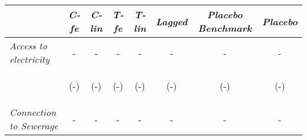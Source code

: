 \begin{tabular}{lccccccc}


\hline
\hline


\multicolumn{1}{l}{} & \multicolumn{1}{c}{\textit{C-fe}} & \multicolumn{1}{c}{\textit{C-lin}} & \multicolumn{1}{c}{\textit{T-fe}} & \multicolumn{1}{c}{\textit{T-lin}} & \multicolumn{1}{c}{\textit{Lagged}} & \multicolumn{1}{c}{\textit{Placebo Benchmark}} & \multicolumn{1}{c}{\textit{Placebo}} \\ 
 

\hline


\textit{Access to electricity}          		  &  -    &    -   &     -  &  -  &     -  & -    & -    \\

\vspace{4pt} & \begin{footnotesize}(-)\end{footnotesize} &  \begin{footnotesize}(-)\end{footnotesize}  &  \begin{footnotesize}(-)\end{footnotesize}    &   \begin{footnotesize}(-)\end{footnotesize}   &  \begin{footnotesize}(-)\end{footnotesize}  &  \begin{footnotesize}(-)\end{footnotesize} &  \begin{footnotesize}(-)\end{footnotesize} \\          



\textit{Connection to Sewerage}          		  &  -    &    -   &     -  &  -  &     -  & -    & -    \\


\end{tabular}
